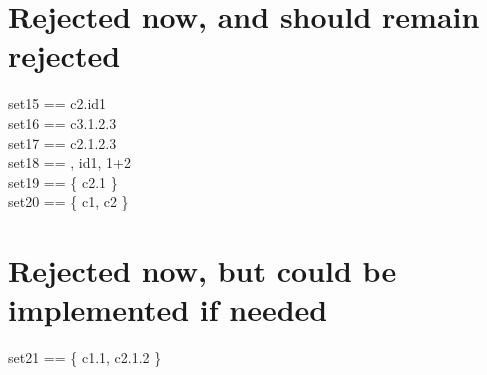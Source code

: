 \documentclass{article}
\begin{document}
\section{Rejected now, and should remain rejected}

\circtoolsoff
\begin{circus}
	\circchannelset set15 == \lchanset c2.id1 \rchanset \\
	\circchannelset set16 == \lchanset c3.1.2.3 \rchanset \\
	\circchannelset set17 == \lchanset c2.1.2.3 \rchanset \\
	\circchannelset set18 == , id1, 1+2 \rchanset \\
	\circchannelset set19 == \{ c2.1 \} \\
	\circchannelset set20 == \{ c1, c2 \} \\
\end{circus}
\circtoolson

\section{Rejected now, but could be implemented if needed}

\circtoolsoff
\begin{circus}
	\circchannelset set21 == \{ c1.1, c2.1.2 \} \\
\end{circus}
\circtoolson
\end{document}
